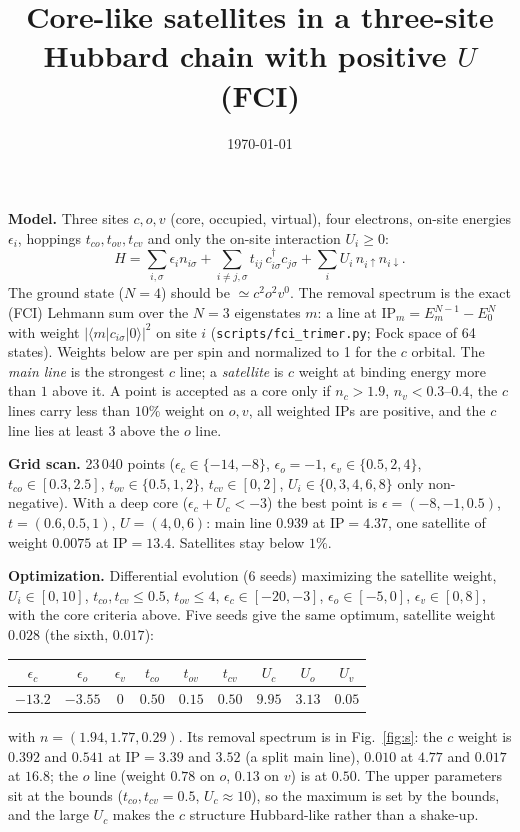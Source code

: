 \documentclass[11pt]{article}
\title{Core-like satellites in a three-site Hubbard chain with positive $U$ (FCI)}
\author{}\date{\today}
\begin{document}
\maketitle

\noindent \textbf{Model.} Three sites $c,o,v$ (core, occupied, virtual), four electrons, on-site energies $\epsilon_i$, hoppings $t_{co},t_{ov},t_{cv}$ and only the on-site interaction $U_i\ge0$:
\begin{equation}
H=\sum_{i,\sigma}\epsilon_i n_{i\sigma}+\sum_{i\ne j,\sigma}t_{ij}\,c^\dagger_{i\sigma}c_{j\sigma}+\sum_i U_i\,n_{i\uparrow}n_{i\downarrow}.
\end{equation}
The ground state ($N=4$) should be $\simeq c^2o^2v^0$. The removal spectrum is the exact (FCI) Lehmann sum over the $N=3$ eigenstates $m$: a line at $\mathrm{IP}_m=E^{N-1}_m-E^N_0$ with weight $|\langle m|c_{i\sigma}|0\rangle|^2$ on site $i$ (\texttt{scripts/fci\_trimer.py}; Fock space of 64 states). Weights below are per spin and normalized to 1 for the $c$ orbital. The \emph{main line} is the strongest $c$ line; a \emph{satellite} is $c$ weight at binding energy more than $1$ above it. A point is accepted as a core only if $n_c>1.9$, $n_v<0.3$--$0.4$, the $c$ lines carry less than $10\%$ weight on $o,v$, all weighted IPs are positive, and the $c$ line lies at least $3$ above the $o$ line.

\noindent \textbf{Grid scan.} 23\,040 points ($\epsilon_c\in\{-14,-8\}$, $\epsilon_o=-1$, $\epsilon_v\in\{0.5,2,4\}$, $t_{co}\in[0.3,2.5]$, $t_{ov}\in\{0.5,1,2\}$, $t_{cv}\in[0,2]$, $U_i\in\{0,3,4,6,8\}$ only non-negative). With a deep core ($\epsilon_c+U_c<-3$) the best point is $\epsilon=(-8,-1,0.5)$, $t=(0.6,0.5,1)$, $U=(4,0,6)$: main line $0.939$ at $\mathrm{IP}=4.37$, one satellite of weight $0.0075$ at $\mathrm{IP}=13.4$. Satellites stay below $1\%$.

\noindent \textbf{Optimization.} Differential evolution (6 seeds) maximizing the satellite weight, $U_i\in[0,10]$, $t_{co},t_{cv}\le0.5$, $t_{ov}\le4$, $\epsilon_c\in[-20,-3]$, $\epsilon_o\in[-5,0]$, $\epsilon_v\in[0,8]$, with the core criteria above. Five seeds give the same optimum, satellite weight $0.028$ (the sixth, $0.017$):
\begin{center}\begin{tabular}{ccc|ccc|ccc}\toprule
$\epsilon_c$&$\epsilon_o$&$\epsilon_v$&$t_{co}$&$t_{ov}$&$t_{cv}$&$U_c$&$U_o$&$U_v$\\\midrule
$-13.2$&$-3.55$&$0$&$0.50$&$0.15$&$0.50$&$9.95$&$3.13$&$0.05$\\\bottomrule\end{tabular}\end{center}
with $n=(1.94,1.77,0.29)$. Its removal spectrum is in Fig.~\ref{fig:s}: the $c$ weight is $0.392$ and $0.541$ at $\mathrm{IP}=3.39$ and $3.52$ (a split main line), $0.010$ at $4.77$ and $0.017$ at $16.8$; the $o$ line (weight $0.78$ on $o$, $0.13$ on $v$) is at $0.50$. The upper parameters sit at the bounds ($t_{co},t_{cv}=0.5$, $U_c\approx10$), so the maximum is set by the bounds, and the large $U_c$ makes the $c$ structure Hubbard-like rather than a shake-up.
\end{document}

